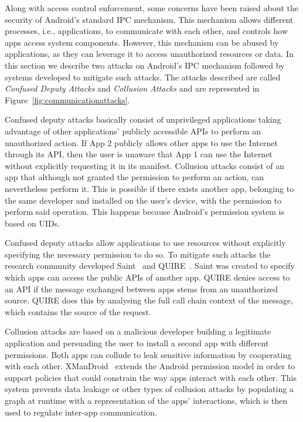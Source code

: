 Along with access control enforcement, some concerns have been raised about the security of Android's standard \ac{IPC} mechanism. This mechanism allows different processes, i.e., applications, to communicate with each other, and controls how apps access system components. However, this mechanism can be abused by applications, as they can leverage it to access unauthorized resources or data. In this section we describe two attacks on Android's IPC mechanism followed by systems developed to mitigate such attacks. The attacks described are called \emph{Confused Deputy Attacks} and \emph{Collusion Attacks} and are represented in Figure~\ref{fig:communicationattacks}.

Confused deputy attacks basically consist of unprivileged applications taking advantage of other applications’ publicly accessible APIs to perform an unauthorized action. If App 2 publicly allows other apps to use the Internet through its API, then the user is unaware that App 1 can use the Internet without explicitly requesting it in its manifest. Collusion attacks consist of an app that although not granted the permission to perform an action, can nevertheless perform it. This is possible if there exists another app, belonging to the same developer and installed on the user’s device, with the permission to perform said operation. This happens because Android’s permission system is based on UIDs.

Confused deputy attacks allow applications to use resources without explicitly specifying the necessary permission to do so. To mitigate such attacks the research community developed Saint~\cite{ongtang2012semantically} and QUIRE~\cite{dietz2011quire}. Saint was created to specify which apps can access the public APIs of another app. QUIRE denies access to an API if the message exchanged between apps stems from an unauthorized source. QUIRE does this by analysing the full call chain context of the message, which contains the source of the request.

Collusion attacks are based on a malicious developer building a legitimate application and persuading the user to install a second app with different permissions. Both apps can collude to leak sensitive information by cooperating with each other. XManDroid~\cite{bugiel2011xmandroid} extends the Android permission model in order to support policies that could constrain the way apps interact with each other. This system prevents data leakage or other types of collusion attacks by populating a graph at runtime with a representation of the apps’ interactions, which is then used to regulate inter-app communication.

